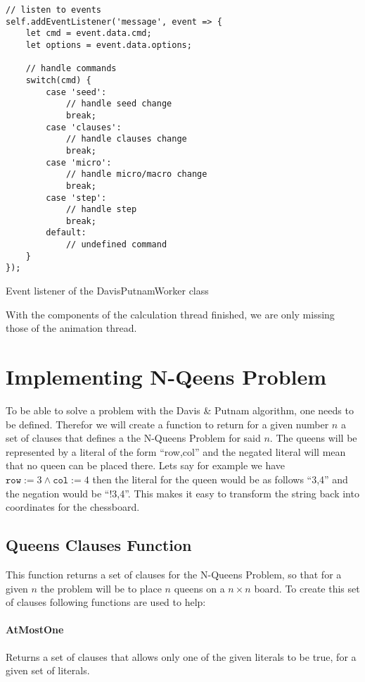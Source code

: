 \begin{listing}[h!]
\begin{verbatim}
// listen to events
self.addEventListener('message', event => {
    let cmd = event.data.cmd;
    let options = event.data.options;

    // handle commands
    switch(cmd) {
        case 'seed':
            // handle seed change
            break;
        case 'clauses':
            // handle clauses change
            break;
        case 'micro':
            // handle micro/macro change
            break;
        case 'step':
            // handle step
            break;
        default:
            // undefined command
    }
});
\end{verbatim}
    \caption{Event listener of the DavisPutnamWorker class}
    \label{code:workerListener}
\end{listing}

With the components of the calculation thread finished, we are only missing those of the animation thread.

\section{Implementing N-Qeens Problem}
\label{sec:impQueens}
To be able to solve a problem with the Davis \& Putnam algorithm, one needs to be defined. Therefor we will create a function to return for a given number $n$ a set of clauses that defines a the N-Queens Problem for said $n$. The queens will be represented by a literal of the form ``row,col'' and the negated literal will mean that no queen can be placed there. Lets say for example we have $\texttt{row} := 3 \land \texttt{col} := 4$ then the literal for the queen would be as follows ``3,4'' and the negation would be ``!3,4''. This makes it easy to transform the string back into coordinates for the chessboard.

\subsection{Queens Clauses Function}
\label{sub:impQueensClauses}
This function returns a set of clauses for the N-Queens Problem, so that for a given $n$ the problem will be to place $n$ queens on a $n \times n$ board. To create this set of clauses following functions are used to help:

\paragraph{AtMostOne}
Returns a set of clauses that allows only one of the given literals to be true, for a given set of literals.

